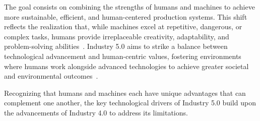 The goal consists on combining the strengths of humans and machines to achieve more sustainable, efficient, and human-centered production systems. This shift reflects the realization that, while machines excel at repetitive, dangerous, or complex tasks, humans provide irreplaceable creativity, adaptability, and problem-solving abilities~\cite{10577684}. Industry 5.0 aims to strike a balance between technological advancement and human-centric values, fostering environments where humans work alongside advanced technologies to achieve greater societal and environmental outcomes~\cite{GOLOVIANKO2023102}.


Recognizing that humans and machines each have unique advantages that can complement one another, the key technological drivers of Industry 5.0 build upon the advancements of Industry 4.0 to address its limitations.

